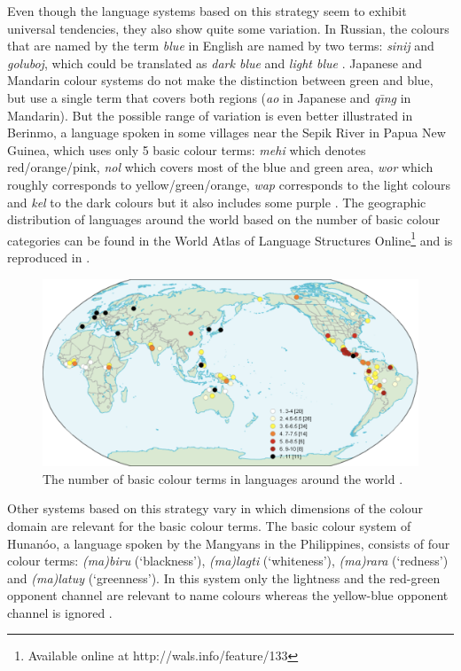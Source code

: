 Even though the language systems based on this strategy seem to
exhibit universal tendencies, they also show quite some
variation. In Russian, the colours that are named by the term \textit{blue}
in English are named by two terms: \textit{sinij} and \textit{goluboj}, which
could be translated as \textit{dark blue} and \textit{light blue}
\citep{safuanova07russian}. Japanese and Mandarin colour systems do
not make the distinction between green and blue, but use a single term
that covers both regions (\textit{ao} in Japanese and \textit{q\= \i ng} in
Mandarin). But the possible range of variation is even better
illustrated in Berinmo, a language spoken in some villages near the
Sepik River in Papua New Guinea, which uses only 5 basic colour terms:
\textit{mehi} which denotes red/orange/pink, \textit{nol} which covers most of
the blue and green area, \textit{wor} which roughly corresponds to
yellow/green/orange, \textit{wap} corresponds to the light colours and
\textit{kel} to the dark colours but it also includes some purple
\citep{roberson02color}. The geographic distribution of languages
around the world based on the number of basic colour categories can be
found in the World Atlas of Language Structures
Online\footnote{Available online at http://wals.info/feature/133} and
is reproduced in  \citep{kay08number}.

\begin{figure}[htbp]
  \begin{center}
    \includegraphics[width=\textwidth]{./intro/figures/number-bcts.pdf}
    \caption[The number of basic colour terms around the world]{The
      number of basic colour terms in languages around the world
      \citep{kay08number}.}
    \label{f:number-bcts}
  \end{center}
\end{figure}

Other systems based on this strategy vary in which dimensions of the
colour domain are relevant for the basic colour terms. The basic
colour system of Hunan\'oo, a language spoken by the Mangyans in the
Philippines, consists of four colour terms: \textit{(ma)biru} (`blackness'),
\textit{(ma)lagti} (`whiteness'), \textit{(ma)rara} (`redness') and \textit{(ma)latuy}
(`greenness'). In this system only the lightness and the red-green
opponent channel are relevant to name colours whereas the yellow-blue
opponent channel is ignored \citep{conklin55hanunoo}.

